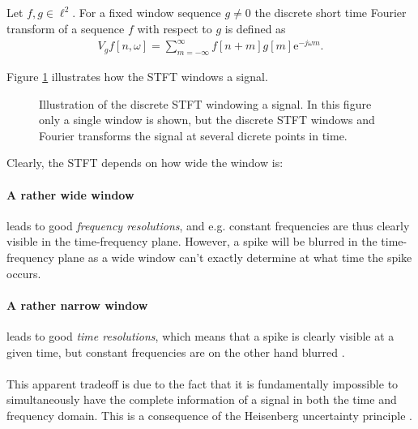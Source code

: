 \begin{definition}\label{def:stft_discrete}
Let $f,g\in\ell^2$. For a fixed window sequence $g\neq0$ the discrete short time Fourier transform of a sequence $f$ with respect to $g$ is defined as
\begin{align}
V_gf[n,\omega]=\sum_{m=-\infty}^{\infty}f[n+m]g[m]\mathrm{e}^{-j\omega m}.
\end{align}
\end{definition}
Figure \ref{fig:sliding_stft} illustrates how the STFT windows a signal.
\begin{figure}[H]
\centering
{}
\caption{Illustration of the discrete STFT windowing a signal. In this figure only a single window is shown, but the discrete STFT windows and Fourier transforms the signal at several dicrete points in time.}
\label{fig:sliding_stft}
\end{figure}
Clearly, the STFT depends on how wide the window is:
\paragraph{A rather wide window} leads to good \textit{frequency resolutions}, and e.g. constant frequencies are thus clearly visible in the time-frequency plane. However, a spike will be blurred in the time-frequency plane as a wide window can't exactly determine at what time the spike occurs.
\paragraph{A rather narrow window} leads to good \textit{time resolutions}, which means that a spike is clearly visible at a given time, but constant frequencies are on the other hand blurred \cite{Davis}. \\ \\
This apparent tradeoff is due to the fact that it is fundamentally impossible to simultaneously have the complete information of a signal in both the time and frequency domain. This is a consequence of the Heisenberg uncertainty principle \cite{Wang}.

